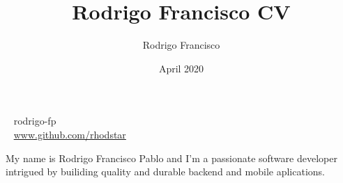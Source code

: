 \documentclass[blue]{pastelcv}              %
\begin{document}
\title{Rodrigo Francisco CV}
\author{Rodrigo Francisco}
\date{April 2020}

\graphicspath{{assets/}}

\thispagestyle{empty}

\begin{center}
 
  \getgreyishblackfont
  {
    \small 
  \faLinkedin~ rodrigo-fp\\[2mm]
  \faGithub~ \protect\url{www.github.com/rhodstar}
  }

\end{center}

\vspace{-2mm}
\begin{center}
  \small My name is Rodrigo Francisco Pablo and I'm a passionate software developer
  intrigued by builiding quality and durable backend and mobile aplications.
\end{center}
\vspace{2mm}
\end{document}
